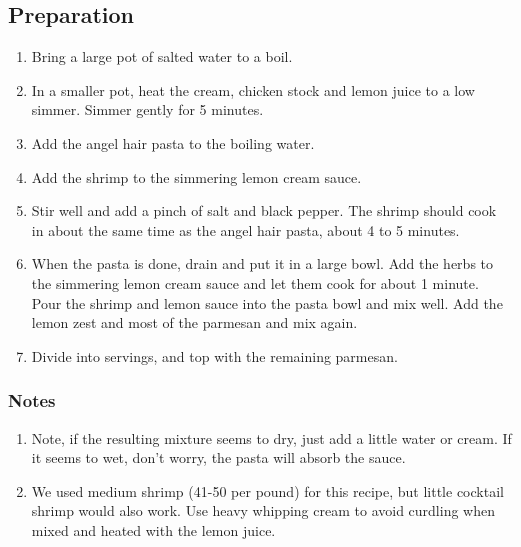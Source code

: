 \subsection{Preparation}
\begin{enumerate}
    \item Bring a large pot of salted water to a boil.
    \item In a smaller pot, heat the cream, chicken stock and lemon juice to a low simmer. Simmer gently for 5 minutes.
    \item Add the angel hair pasta to the boiling water.
    \item Add the shrimp to the simmering lemon cream sauce. 
    \item Stir well and add a pinch of salt and black pepper. The shrimp should cook in about the same time as the angel hair pasta, about 4 to 5 minutes.
    \item When the pasta is done, drain and put it in a large bowl. Add the herbs to the simmering lemon cream sauce and let them cook for about 1 minute. Pour the shrimp and lemon sauce into the pasta bowl and mix well. Add the lemon zest and most of the parmesan and mix again.
    \item Divide into servings, and top with the remaining parmesan.
\end{enumerate}

\subsubsection{Notes}
\begin{enumerate}
    \item Note, if the resulting mixture seems to dry, just add a little water or cream. If it seems to wet, don't worry, the pasta will absorb the sauce.
    \item We used medium shrimp (41-50 per pound) for this recipe, but little cocktail shrimp would also work. Use heavy whipping cream to avoid curdling when mixed and heated with the lemon juice.
\end{enumerate}
